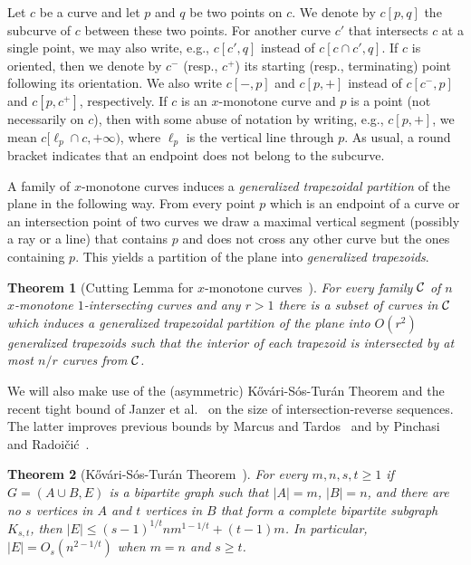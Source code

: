\documentclass[11pt]{article}
\newtheorem{theorem}{Theorem}
\theoremstyle{definition}
\def\C{{\cal C}}
\begin{document}
Let $c$ be a curve and let $p$ and $q$ be two points on $c$.
We denote by $c[p,q]$ the subcurve of $c$ between these two points.
For another curve $c'$ that intersects $c$ at a single point, %
we may also write, e.g., $c[c',q]$ instead of $c[c \cap c',q]$.
If $c$ is oriented, then we denote by $c^-$ (resp., $c^+$) its starting (resp., terminating) point following its orientation.
We also write $c[-,p]$ and $c[p,+]$ instead of $c[c^-,p]$ and $c[p,c^+]$, respectively.
If $c$ is an $x$-monotone curve and $p$ is a point (not necessarily on $c$),
then with some abuse of notation by writing, e.g., $c[p,+]$, we mean $c[\ell_p \cap c,+\infty)$, where $\ell_p$ is the vertical line through $p$.
As usual, a round bracket indicates that an endpoint does not belong to the subcurve.    

A family of $x$-monotone curves induces a \emph{generalized trapezoidal partition} of the plane in the following way. From every point $p$ which is an endpoint of a curve or an intersection point of two curves we draw a maximal vertical segment (possibly a ray or a line) that contains $p$ and does not cross any other curve but the ones containing $p$.
This yields a partition of the plane into \emph{generalized trapezoids}.

\begin{theorem}[Cutting Lemma for $x$-monotone curves~{\cite[Proposition 2.11]{Sariel00}}]\label{thm:cutting-lemma}
	For every family $\C$ of $n$ $x$-monotone $1$-intersecting curves and any $r>1$ there is a subset of curves in $\C$ which induces a generalized trapezoidal partition of the plane into $O(r^2)$ generalized trapezoids such that the interior of each trapezoid is intersected by at most $n/r$ curves from $\C$.
\end{theorem}

We will also make use of the (asymmetric) K\H{o}v\'ari-S\'os-Tur\'an Theorem
and the recent tight bound of Janzer et al.~\cite{janzer2025} on the size of intersection-reverse sequences.
The latter improves previous bounds by Marcus and Tardos~\cite{MT06} and by Pinchasi and Radoi\v{c}i\'c~\cite{crossingC4}.

\begin{theorem}[K\H{o}v\'ari-S\'os-Tur\'an Theorem~\cite{Kovari}]
	For every $m,n,s,t \ge 1$ if $G=(A \cup B,E)$ is a bipartite graph such that $|A|=m$, $|B|=n$, and there are no $s$ vertices in $A$ and $t$ vertices in $B$ that form a complete bipartite subgraph $K_{s,t}$, then $|E| \le (s-1)^{1/t}nm^{1-1/t}+(t-1)m$.
	In particular, $|E| = O_s(n^{2-1/t})$ when $m=n$ and $s \ge t$.
\end{theorem}
\end{document}
